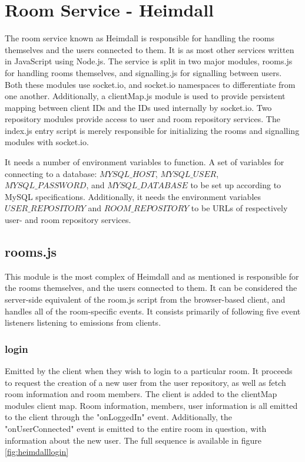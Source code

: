 \section{Room Service - Heimdall}

The room service known as Heimdall is responsible for handling the rooms themselves and the users connected to them. It is as most other services written in JavaScript using Node.js. The service is split in two major modules, rooms.js for handling rooms themselves, and signalling.js for signalling between users. Both these modules use socket.io, and socket.io namespaces to differentiate from one another. Additionally, a clientMap.js module is used to provide persistent mapping between client IDs and the IDs used internally by socket.io. Two repository modules provide access to user and room repository services. The index.js entry script is merely responsible for initializing the rooms and signalling modules with socket.io.

It needs a number of environment variables to function. A set of variables for connecting to a database: $MYSQL\_HOST$, $MYSQL\_USER$, $MYSQL\_PASSWORD$, and $MYSQL\_DATABASE$ to be set up according to MySQL specifications. Additionally, it needs the environment variables $USER\_REPOSITORY$ and $ROOM\_REPOSITORY$ to be URLs of respectively user- and room repository services.

\subsection{rooms.js}

This module is the most complex of Heimdall and as mentioned is responsible for the rooms themselves, and the users connected to them. It can be considered the server-side equivalent of the room.js script from the browser-based client, and handles all of the room-specific events. It consists primarily of following five event listeners listening to emissions from clients.

\subsubsection{login}

Emitted by the client when they wish to login to a particular room. It proceeds to request the creation of a new user from the user repository, as well as fetch room information and room members. The client is added to the clientMap modules client map. Room information, members, user information is all emitted to the client through the "onLoggedIn" event. Additionally, the "onUserConnected" event is emitted to the entire room in question, with information about the new user. The full sequence is available in figure \ref{fig:heimdalllogin}

